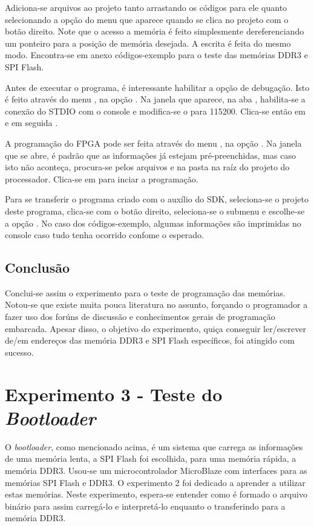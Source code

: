 \documentclass[11pt,a4paper,oneside]{book}
\begin{document}
Adiciona-se arquivos ao projeto tanto arrastando os códigos para ele quanto selecionando a opção  do menu que aparece quando se clica no projeto com o botão direito.
Note que o acesso a memória é feito simplesmente dereferenciando um ponteiro para a posição de memória desejada.
A escrita é feita do mesmo modo.
Encontra-se em anexo códigos-exemplo para o teste das memórias DDR3 e SPI Flash.

Antes de executar o programa, é interessante habilitar a opção de debugação.
Isto é feito através do menu , na opção .
Na janela que aparece, na aba , habilita-se a conexão do STDIO com o console e modifica-se o  para 115200.
Clica-se então em  e em seguida .

A programação do FPGA pode ser feita através do menu , na opção .
Na janela que se abre, é padrão que as informações já estejam pré-preenchidas, mas caso isto não aconteça, procura-se pelos arquivos  e  na pasta  na raíz do projeto do processador.
Clica-se em  para inciar a programação.

Para se transferir o programa criado com o auxílio do SDK, seleciona-se o projeto deste programa, clica-se com o botão direito, seleciona-se o submenu  e escolhe-se a opção .
No caso dos códigos-exemplo, algumas informações são imprimidas no console caso tudo tenha ocorrido confome o esperado.

\section{Conclusão}
Conclui-se assim o experimento para o teste de programação das memórias.
Notou-se que existe muita pouca literatura no assunto, forçando o programador a fazer uso dos forúns de discussão e conhecimentos gerais de programação embarcada.
Apesar disso, o objetivo do experimento, quiça conseguir ler/escrever de/em endereços das memória DDR3 e SPI Flash específicos, foi atingido com sucesso.

\chapter{Experimento 3 - Teste do \textit{Bootloader}}
O \textit{bootloader}, como mencionado acima, é um sistema que carrega as informações de uma memória lenta, a SPI Flash foi escolhida, para uma memória rápida, a memória DDR3.
Usou-se um microcontrolador MicroBlaze com interfaces para as memórias SPI Flash e DDR3.
O experimento 2 foi dedicado a aprender a utilizar estas memórias.
Neste experimento, espera-se entender como é formado o arquivo binário para assim carregá-lo e interpretá-lo enquanto o transferindo para a memória DDR3.
\end{document}
